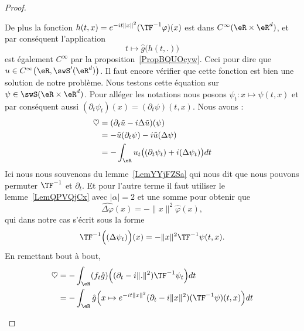 \begin{proof}
\begin{subproof}
        De plus la fonction \( h(t,x)= e^{-it\| x \|^2}(\TF^{-1}\varphi)(x)\) est dans \(  C^{\infty}(\eR\times \eR^d)\), et par conséquent l'application
        \begin{equation}
            t\mapsto \hat g\big( h(t,.) \big)
        \end{equation}
        est également \(  C^{\infty}\) par la proposition~\ref{PropBQUOcyw}. Ceci pour dire que \( u\in C^{\infty}\big( \eR,\swS'(\eR^d) \big)\). Il faut encore vérifier que cette fonction est bien une solution de notre problème. Nous testons cette équation sur \( \psi\in\swS(\eR\times\eR^d)\). Pour alléger les notations nous posons \( \psi_t\colon x\mapsto \psi(t,x)\) et par conséquent aussi \( (\partial_t\psi_t)(x)=(\partial_t\psi)(t,x)\). Nous avons :
        \begin{subequations}
            \begin{align}
                \heartsuit&=(\partial_t\tilde u-i\Delta\tilde u)(\psi)\\
                &=-\tilde u(\partial_t\psi)-i\tilde u(\Delta\psi)\\
                &=-\int_{\eR}u_t\big( (\partial_t\psi_t)+i(\Delta\psi_t) \big)dt
            \end{align}
        \end{subequations}
        Ici nous nous souvenons du lemme~\ref{LemYYjFZSa} qui nous dit que nous pouvons permuter \( \TF^{-1}\) et \( \partial_t\). Et pour l'autre terme il faut utiliser le lemme~\ref{LemQPVQjCx} avec \( | \alpha |=2\) et une somme pour obtenir que
        \begin{equation}
            \widehat{\Delta\varphi}(x)=-\| x \|^2\hat\varphi(x),
        \end{equation}
        qui dans notre cas s'écrit sous la forme
        \begin{equation}
            \TF^{-1}\Big( (\Delta\psi_t) \Big)(x)=-\| x \|^2\TF^{-1}\psi(t,x).
        \end{equation}
        En remettant bout à bout,
        \begin{subequations}
            \begin{align}
                \heartsuit&=-\int_{\eR}(f_t\hat g)\Big( (\partial_t-i\| . \|^2)\TF^{-1}\psi_t \Big)dt\\
                &=-\int_{\eR}\hat g\Big( x\mapsto  e^{-it\| x \|^2}(\partial_t-i\| x \|^2)(\TF^{-1}\psi)(t,x) \Big)dt
            \end{align}
        \end{subequations}

\end{subproof}
\end{proof}
